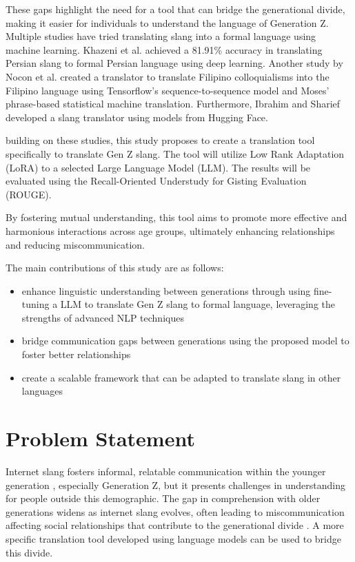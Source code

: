 These gaps highlight the need for a tool that can bridge the generational divide, making it easier for individuals to understand the language of Generation Z. Multiple studies have tried translating slang into a formal language using machine learning. Khazeni et al. achieved a 81.91\% accuracy in translating Persian slang to formal Persian language using deep learning. Another study by Nocon et al. created a translator to translate Filipino colloquialisms into the Filipino language using Tensorflow’s sequence-to-sequence model and Moses’ phrase-based statistical machine translation. Furthermore, Ibrahim and Sharief developed a slang translator using models from Hugging Face. 

building on these studies, this study proposes to create a translation tool specifically to translate Gen Z slang. The tool will utilize Low Rank Adaptation (LoRA) to a selected Large Language Model (LLM). The results will be evaluated using the Recall-Oriented Understudy for Gisting Evaluation (ROUGE). 

By fostering mutual understanding, this tool aims to promote more effective and harmonious interactions across age groups, ultimately enhancing relationships and reducing miscommunication.

The main contributions of this study are as follows:
\begin{itemize}
    \item enhance linguistic understanding between generations through using fine-tuning a LLM to translate Gen Z slang to formal language, leveraging the strengths of advanced NLP techniques
    \item bridge communication gaps between generations using the proposed model to foster better relationships
    \item create a scalable framework that can be adapted to translate slang in other languages
\end{itemize}

\section{Problem Statement}
\label{sec:problem_statement}

Internet slang fosters informal, relatable communication within the younger generation \cite{Ghazali_Abdullah_2021}, especially Generation Z, but it presents challenges in understanding for people outside this demographic. 
The gap in comprehension with older generations widens as internet slang evolves, often leading to miscommunication affecting social relationships that contribute to the generational divide \cite{Vacalares_Salas_Babac_Cagalawan_Calimpong_2023}. 
A more specific translation tool developed using language models can be used to bridge this divide.

